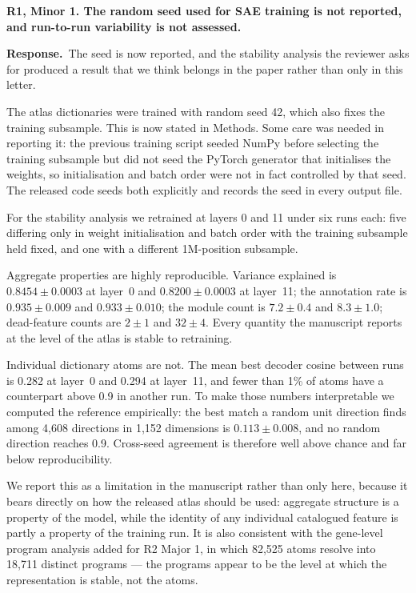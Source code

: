 \documentclass[11pt]{article}
\newcommand{\point}[1]{\vspace{0.7em}\noindent\textbf{#1}\par\vspace{0.15em}}
\newcommand{\reply}{\par\vspace{0.3em}\noindent\textbf{Response.}\ }
\begin{document}
\point{R1, Minor 1. The random seed used for SAE training is not reported, and run-to-run
variability is not assessed.}
\reply The seed is now reported, and the stability analysis the reviewer asks for produced a result that
we think belongs in the paper rather than only in this letter.

The atlas dictionaries were trained with random seed 42, which also fixes the training subsample.
This is now stated in Methods. Some care was needed in reporting it: the previous training script
seeded NumPy before selecting the training subsample but did not seed the PyTorch generator that
initialises the weights, so initialisation and batch order were not in fact controlled by that seed.
The released code seeds both explicitly and records the seed in every output file.

For the stability analysis we retrained at layers 0 and 11 under six runs each: five differing only
in weight initialisation and batch order with the training subsample held fixed, and one with a
different 1M-position subsample.

Aggregate properties are highly reproducible. Variance explained is $0.8454 \pm 0.0003$ at layer~0
and $0.8200 \pm 0.0003$ at layer~11; the annotation rate is $0.935 \pm 0.009$ and $0.933 \pm 0.010$;
the module count is $7.2 \pm 0.4$ and $8.3 \pm 1.0$; dead-feature counts are $2 \pm 1$ and
$32 \pm 4$. Every quantity the manuscript reports at the level of the atlas is stable to retraining.

Individual dictionary atoms are not. The mean best decoder cosine between runs is 0.282 at layer~0
and 0.294 at layer~11, and fewer than 1\% of atoms have a counterpart above 0.9 in another run. To
make those numbers interpretable we computed the reference empirically: the best match a random
unit direction finds among 4,608 directions in 1,152 dimensions is $0.113 \pm 0.008$, and no random
direction reaches 0.9. Cross-seed agreement is therefore well above chance and far below
reproducibility.

We report this as a limitation in the manuscript rather than only here, because it bears directly on
how the released atlas should be used: aggregate structure is a property of the model, while the
identity of any individual catalogued feature is partly a property of the training run. It is also
consistent with the gene-level program analysis added for R2 Major 1, in which 82,525 atoms resolve
into 18,711 distinct programs --- the programs appear to be the level at which the representation is
stable, not the atoms.
\end{document}
